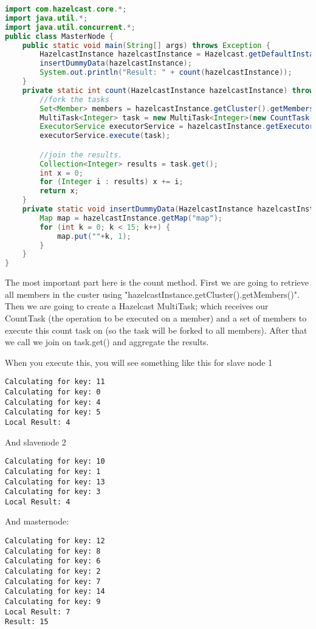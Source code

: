 \begin{lstlisting}[language=java]
import com.hazelcast.core.*;
import java.util.*;
import java.util.concurrent.*;
public class MasterNode {
    public static void main(String[] args) throws Exception {
        HazelcastInstance hazelcastInstance = Hazelcast.getDefaultInstance();
        insertDummyData(hazelcastInstance);
        System.out.println("Result: " + count(hazelcastInstance));
    }
    private static int count(HazelcastInstance hazelcastInstance) throws Exception {
        //fork the tasks
        Set<Member> members = hazelcastInstance.getCluster().getMembers();
        MultiTask<Integer> task = new MultiTask<Integer>(new CountTask(), members);
        ExecutorService executorService = hazelcastInstance.getExecutorService();
        executorService.execute(task);

        //join the results.
        Collection<Integer> results = task.get();
        int x = 0;
        for (Integer i : results) x += i;
        return x;
    }
    private static void insertDummyData(HazelcastInstance hazelcastInstance) {
        Map map = hazelcastInstance.getMap("map");
        for (int k = 0; k < 15; k++) {
            map.put(""+k, 1);
        }
    }
}
\end{lstlisting}
The most important part here is the count method. First we are going to retrieve all members in the custer using "hazelcastInstance.getCluster().getMembers()". Then we are going to create a Hazelcast MultiTask; which receives our CountTask (the operation to be executed on a member) and a set of members to execute this count task on (so the task will be forked to all members). After that we call we join on task.get() and aggregate the results.

When you execute this, you will see something like this for slave node 1
\begin{verbatim}
Calculating for key: 11
Calculating for key: 0
Calculating for key: 4
Calculating for key: 5
Local Result: 4
\end{verbatim}

And slavenode 2
\begin{verbatim}
Calculating for key: 10
Calculating for key: 1
Calculating for key: 13
Calculating for key: 3
Local Result: 4
\end{verbatim}

And masternode:
\begin{verbatim}
Calculating for key: 12
Calculating for key: 8
Calculating for key: 6
Calculating for key: 2
Calculating for key: 7
Calculating for key: 14
Calculating for key: 9
Local Result: 7
Result: 15
\end{verbatim}

